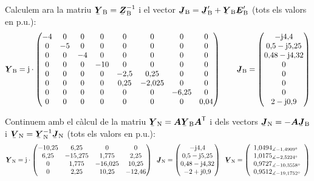 \begin{exemple}
Calculem ara la matriu $\mcmplx{Y}\ped{B}=\mcmplx{Z}\ped{B}^{-1}$ i el vector $\mcmplx{J}\ped{B} = \mcmplx{J}\ped{B}' + \mcmplx{Y}\ped{B} \mcmplx{E}\ped{B}'$  (tots els valors en p.u.):
\[
   \mcmplx{Y}\ped{B} = \ju \cdot
   \begin{pmatrix}
     -4 & 0 & 0 & 0 & 0 & 0 & 0 & 0 \\
     0 & -5 & 0 & 0 & 0 & 0 & 0 & 0 \\
     0 & 0 & -4 & 0 & 0 & 0 & 0 & 0 \\
     0 & 0 & 0 & -10 & 0 & 0 & 0 & 0 \\
     0 & 0 & 0 & 0 & -2{,}5 & 0{,}25 & 0 & 0 \\
     0 & 0 & 0 & 0 & 0{,}25 & -2{,}025 & 0 & 0 \\
     0 & 0 & 0 & 0 & 0 & 0 & -6{,}25 & 0 \\
     0 & 0 & 0 & 0 & 0 & 0 & 0 & 0{,}04
   \end{pmatrix}
   \qquad
   \mcmplx{J}\ped{B} =
   \begin{pmatrix}
    -\ju 4{,}4 \\
    0{,}5 - \ju 5{,}25 \\
    0{,}48 - \ju 4{,}32 \\
    0 \\
    0 \\
    0 \\
    0 \\
    2 - \ju 0{,}9
   \end{pmatrix}
\]

Continuem amb el c\`{a}lcul de la matriu $\mcmplx{Y}\ped{N} =
\boldsymbol{A} \mcmplx{Y}\ped{B} \transp{\boldsymbol{A}}$ i dels
vectors $\mcmplx{J}\ped{N} = - \boldsymbol{A} \mcmplx{J}\ped{B}$ i
$\mcmplx{V}\ped{N} = \mcmplx{Y}\ped{N}^{-1} \mcmplx{J}\ped{N}$ (tots
els valors en p.u.):
\[
   \mcmplx{Y}\ped{N} = \ju \cdot
   \begin{pmatrix}
     -10{,}25 & 6{,}25 & 0 & 0 \\
     6{,}25 & -15{,}275 & 1{,}775 & 2{,}25 \\
     0 & 1{,}775 & -16{,}025 & 10{,}25 \\
     0 & 2{,}25 & 10{,}25 & -12{,}46
   \end{pmatrix}
   \;\;
   \mcmplx{J}\ped{N} =
   \begin{pmatrix}
    -\ju 4{,}4 \\
    0{,}5 - \ju 5{,}25 \\
    0{,}48 - \ju 4{,}32 \\
    -2 + \ju 0{,}9
   \end{pmatrix}
   \;\;
   \mcmplx{V}\ped{N} =
   \left(\begin{array}{l}
    1{,}0494_{\measuredangle -1{,}4909\degree} \\
    1{,}0175_{\measuredangle -2{,}5224\degree} \\
    0{,}9727_{\measuredangle -10{,}3558\degree} \\
    0{,}9512_{\measuredangle -19{,}1752\degree}
   \end{array}\right)
\]


\end{exemple}
